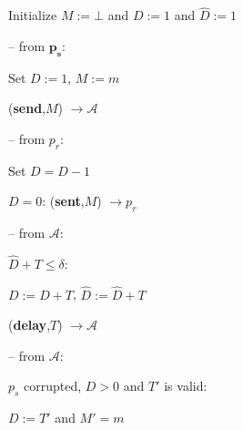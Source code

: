 \begin{bbox}[title={\textbf{Functionality} $\F_{\msf{BD-SEC}}^{\delta,\ell}(p_s,p_r)$}]

Initialize $M := \bot$ and $D := 1$ and $\hat{D} := 1$

-- \OnInput {} from $\mathbf{p_s}$:

	\qquad Set $D := 1$, $M := m$

	\qquad \Leak ({\bf send},$M$) $\rightarrow \mathcal{A}$

-- \OnInput {} from $p_r$:

	\qquad Set $D = D - 1$

	\qquad \If $D = 0$: \Send ({\bf sent},$M$) $\rightarrow p_r$

-- \OnInput {} from $\mathcal{A}$:

	\qquad \If $\hat{D} + T \leq \delta$: 

		\qquad \quad $D := D + T$, $\hat{D} := \hat{D} + T$

		\qquad \quad \Send ({\bf delay},$T$) $\rightarrow \mathcal{A}$

-- \OnInput {} from $\mathcal{A}$:

	\qquad \If $p_s$ corrupted, $D > 0$ and $T'$ is valid:

		\qquad \quad $D := T'$ and $M' = m$
\end{bbox}

